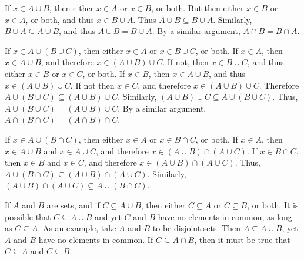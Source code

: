\documentclass[crop=false,class=book,oneside]{standalone}
\begin{document}
            \begin{bproof}
                If $x\in{A}\cup{B}$, then either $x\in{A}$ or $x\in{B}$,
                or both. But then either $x\in{B}$ or $x\in{A}$, or both,
                and thus $x\in{B}\cup{A}$. Thus $A\cup{B}\subseteq{B}\cup{A}$.
                Similarly, $B\cup{A}\subseteq{A}\cup{B}$, and thus
                $A\cup{B}=B\cup{A}$. By a similar argument,
                $A\cap{B}=B\cap{A}$.
                \par\hfill\par
                If $x\in{A}\cup(B\cup{C})$, then either
                $x\in{A}$ or $x\in{B}\cup{C}$, or both.
                If $x\in{A}$, then $x\in{A}\cup{B}$, and
                therefore $x\in(A\cup{B})\cup{C}$. If not,
                then $x\in{B}\cup{C}$, and thus either
                $x\in{B}$ or $x\in{C}$, or both.
                If $x\in{B}$, then $x\in{A}\cup{B}$, and
                thus $x\in(A\cup{B})\cup{C}$. If not
                then $x\in{C}$, and therefore
                $x\in(A\cup{B})\cup{C}$. Therefore
                $A\cup(B\cup{C})\subseteq(A\cup{B})\cup{C}$.
                Similarly, $(A\cup{B})\cup{C}\subseteq{A}\cup(B\cup{C})$.
                Thus, $A\cup(B\cup{C})=(A\cup{B})\cup{C}$. By a similar
                argument, $A\cap(B\cap{C})=(A\cap{B})\cap{C}$.
                \par\hfill\par
                If $x\in{A}\cup(B\cap{C})$, then either $x\in{A}$
                or $x\in{B}\cap{C}$, or both. If $x\in{A}$, then
                $x\in{A}\cup{B}$ and $x\in{A}\cup{C}$, and therefore
                $x\in(A\cup{B})\cap(A\cup{C})$. If $x\in{B}\cap{C}$,
                then $x\in{B}$ and $x\in{C}$, and therefore
                $x\in(A\cup{B})\cap(A\cup{C})$. Thus,
                $A\cup(B\cap{C})\subseteq(A\cup{B})\cap(A\cup{C})$.
                Similarly,
                $(A\cup{B})\cap(A\cup{C})\subseteq{A}\cup(B\cap{C})$.
            \end{bproof}
            If $A$ and $B$ are sets, and if $C\subseteq{A}\cup{B}$, then
            either $C\subseteq{A}$ or $C\subseteq{B}$, or both. It is
            possible that $C\subseteq{A}\cup{B}$ and yet $C$ and $B$ have no
            elements in common, as long as $C\subseteq{A}$. As an example,
            take $A$ and $B$ to be disjoint sets. Then $A\subseteq{A}\cup{B}$,
            yet $A$ and $B$ have no elements in common. If
            $C\subseteq{A}\cap{B}$, then it must be true that
            $C\subseteq{A}$ and $C\subseteq{B}$.
\end{document}
